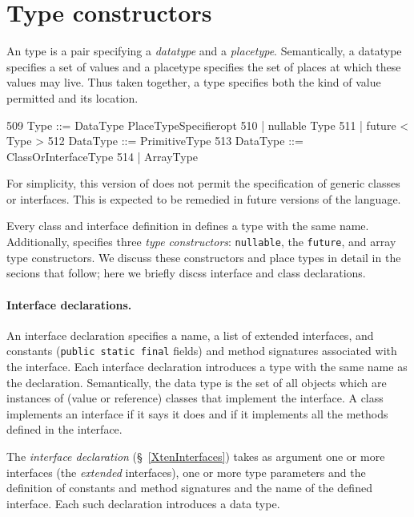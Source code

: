 \section{Type constructors}\label{TypeConstructors}

An \Xten{} type is a pair specifying a {\em datatype} and a {\em
placetype}. Semantically, a datatype specifies a set of values and a
placetype specifies the set of places at which these values may
live. Thus taken together, a type specifies both the kind of value
permitted and its location. 

\begin{x10}
509   Type ::=  DataType  PlaceTypeSpecifieropt
510     | nullable  Type
511     | future <  Type > 
512   DataType ::=  PrimitiveType
513   DataType ::=  ClassOrInterfaceType
514     |  ArrayType
\end{x10}

For simplicity, this version of \Xten{} does not permit the
specification of generic classes or interfaces. This is expected to be
remedied in future versions of the language.

Every class and interface definition in \Xten{} defines a type with
the same name. Additionally, {}\Xten{} specifies three {\em type
constructors}: {\tt nullable}, the {\tt future}, and array type
constructors. We discuss these constructors and place types in detail
in the secions that follow; here we briefly discss interface and class
declarations.

\paragraph{Interface declarations.}\label{InterfaceTypes}
An interface declaration specifies a name, a list of extended
interfaces, and constants ({\tt public static final} fields) and
method signatures associated with the interface. Each interface
declaration introduces a type with the same name as the declaration.
Semantically, the data type is the set of all objects which are
instances of (value or reference) classes that implement the
interface. A class implements an interface if it says it does and if
it implements all the methods defined in the interface.


The {\em interface declaration} (\S~\ref{XtenInterfaces}) takes as
argument one or more interfaces (the {\em extended} interfaces), one
or more type parameters and the definition of constants and method
signatures and the name of the defined interface.  Each such
declaration introduces a data type.

